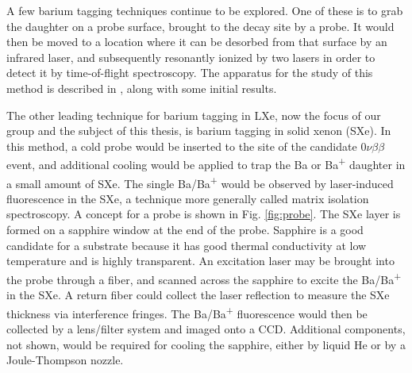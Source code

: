 
A few barium tagging techniques continue to be explored.  One of these is to grab the daughter on a probe surface, brought to the decay site by a probe.  It would then be moved to a location where it can be desorbed from that surface by an infrared laser, and subsequently resonantly ionized by two lasers in order to detect it by time-of-flight spectroscopy.  The apparatus for the study of this method is described in \cite{Twelker2014}, along with some initial results.

The other leading technique for barium tagging in LXe, now the focus of our group and the subject of this thesis, is barium tagging in solid xenon (SXe).  In this method, a cold probe would be inserted to the site of the candidate $0\nu\beta\beta$ event, and additional cooling would be applied to trap the Ba or Ba\textsuperscript{+} daughter in a small amount of SXe.  The single Ba/Ba\textsuperscript{+} would be observed by laser-induced fluorescence in the SXe, a technique more generally called matrix isolation spectroscopy.  A concept for a probe is shown in Fig. \ref{fig:probe}.  The SXe layer is formed on a sapphire window at the end of the probe.  Sapphire is a good candidate for a substrate because it has good thermal conductivity at low temperature and is highly transparent.  An excitation laser may be brought into the probe through a fiber, and scanned across the sapphire to excite the Ba/Ba\textsuperscript{+} in the SXe.  A return fiber could collect the laser reflection to measure the SXe thickness via interference fringes.  The Ba/Ba\textsuperscript{+} fluorescence would then be collected by a lens/filter system and imaged onto a CCD.  Additional components, not shown, would be required for cooling the sapphire, either by liquid He or by a Joule-Thompson nozzle.

